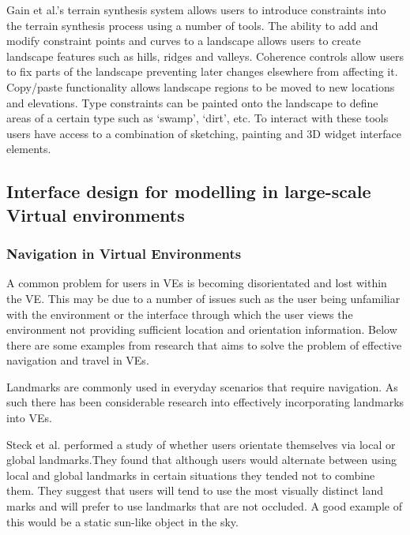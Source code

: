 \documentclass{sig-alternate-05-2015}
\begin{document}
 Gain et al.'s terrain synthesis system allows users to introduce constraints into the terrain synthesis process using a number of tools\cite{Gain2015}. The ability to add and modify constraint points and curves to a landscape allows users to create landscape features such as hills, ridges and valleys.  Coherence controls allow users to fix parts of the landscape preventing later changes elsewhere from affecting it. Copy/paste functionality allows landscape regions to be moved to new locations and elevations. Type constraints can be painted onto the landscape to define areas of a certain type such as `swamp', `dirt', etc. To interact with these tools users have access to a combination of sketching, painting and 3D widget interface elements. 

\subsection{Interface design for modelling in large-scale Virtual environments}
\subsubsection{Navigation in Virtual Environments}
A common problem for users in VEs is becoming disorientated and lost within the VE\cite{Darken1993}. This may be due to a number of issues such as the user being unfamiliar with the environment or the interface through which the user views the environment not providing sufficient location and orientation information. Below there are some examples from research that aims to solve the problem of effective navigation and travel in VEs.

Landmarks are commonly used in everyday scenarios that require navigation. As such there has been considerable research into effectively incorporating landmarks into VEs.

Steck et al. performed a study of whether users orientate themselves via local or global landmarks\cite{Steck2000}.They found that although users would alternate between using local and global landmarks in certain situations they tended not to combine them. They suggest that users will tend to use the most visually distinct land marks and will prefer to use landmarks that are not occluded. A good example of this would be a static sun-like object in the sky. %
\end{document}
